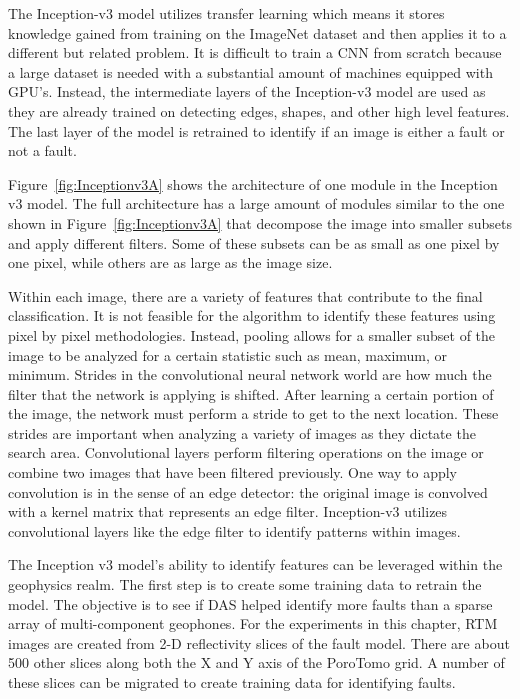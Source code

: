 The Inception-v3 model utilizes transfer learning which means it stores knowledge gained from training on the ImageNet dataset and then applies it to a different but related problem. It is difficult to train a CNN from scratch because a large dataset is needed with a substantial amount of machines equipped with GPU's. Instead, the intermediate layers of the Inception-v3 model are used as they are already trained on detecting edges, shapes, and other high level features. The last layer of the model is retrained to identify if an image is either a fault or not a fault.

Figure~\ref{fig:Inceptionv3A} shows the architecture of one module in the Inception v3 model. The full architecture has a large amount of modules similar to the one shown in Figure~\ref{fig:Inceptionv3A} that decompose the image into smaller subsets and apply different filters. Some of these subsets can be as small as one pixel by one pixel, while others are as large as the image size.


Within each image, there are a variety of features that contribute to the final classification. It is not feasible for the algorithm to identify these features using pixel by pixel methodologies. Instead, pooling allows for a smaller subset of the image to be analyzed for a certain statistic such as mean, maximum, or minimum. Strides in the convolutional neural network world are how much the filter that the network is applying is shifted. After learning a certain portion of the image, the network must perform a stride to get to the next location. These strides are important when analyzing a variety of images as they dictate the search area. Convolutional layers perform filtering operations on the image or combine two images that have been filtered previously. One way to apply convolution is in the sense of an edge detector: the original image is convolved with a kernel matrix that represents an edge filter. Inception-v3 utilizes convolutional layers like the edge filter to identify patterns within images.

The Inception v3 model's ability to identify features can be leveraged within the geophysics realm. The first step is to create some training data to retrain the model. The objective is to see if DAS helped identify more faults than a sparse array of multi-component geophones. For the experiments in this chapter, RTM images are created from 2-D reflectivity slices of the \citet{siler2013three} fault model. There are about 500 other slices along both the X and Y axis of the PoroTomo grid. A number of these slices can be migrated to create training data for identifying faults.

